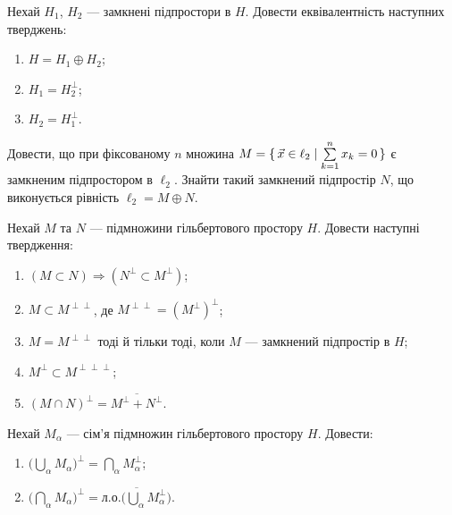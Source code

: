 
\begin{exercise}
    Нехай $H_1$, $H_2$ --- замкнені підпростори в $H$.
    Довести еквівалентність наступних тверджень:
    \begin{enumerate}[label=\ukr*)]
        \item $H = H_1 \oplus H_2$;
        \item $H_1 = H_2^\perp $;
        \item $H_2 = H_1^\perp $.
    \end{enumerate}
\end{exercise}

\begin{exercise}
    Довести, що при фіксованому $n$ множина $M = \set{ \vec{x} \in \ell_2
    \mid \sum\limits^n_{k=1} x_k=0 }$ є замкненим підпростором в $\ell_2$.
    Знайти такий замкнений підпростір $N$, що виконується рівність $\ell_2 = M \oplus N$.
\end{exercise}

\begin{exercise}
    Нехай $M$ та $N$ --- підмножини гільбертового простору $H$. Довести наступні твердження:
    \begin{enumerate}[label=\ukr*)]
        \item $(M \subset N) \Rightarrow (N^\perp \subset M^\perp)$;
        \item $M \subset M^{\perp\perp}$, де $M^{\perp\perp}={(M^\perp)}^\perp$;
        \item $M = M^{\perp\perp}$ тоді й тільки тоді, коли $M$ ---
              замкнений підпростір в $H$;
        \item $M^\perp \subset M^{\perp\perp\perp}$;
        \item $(M \cap N)^\perp = \overline{M^\perp + N^\perp}$.
    \end{enumerate}
\end{exercise}

\begin{exercise}
    Нехай $M_\alpha$ --- сім'я підмножин гільбертового простору $H$. Довести:
    \begin{enumerate}[label=\ukr*)]
        \item $\Big( \bigcup\limits_\alpha M_\alpha \Big)^\perp = 
              \bigcap\limits_\alpha M_\alpha^\perp$;
        \item $\Big( \bigcap\limits_\alpha M_\alpha \Big)^\perp = 
              \overline{\text{л.о.}\Big(\bigcup\limits_\alpha M_\alpha^\perp\Big)}$.
    \end{enumerate}
\end{exercise}


